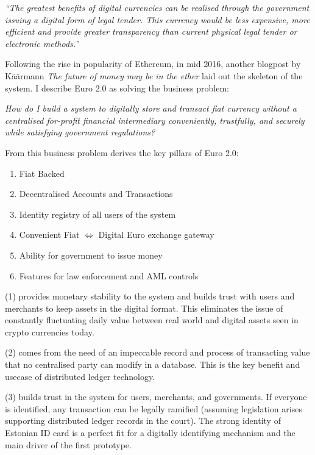 \documentclass[12pt]{article} %
\begin{document}
{{\begin{quoting}
	\textit{``The greatest benefits of digital currencies can be realised through the government issuing a digital form of legal tender. This currency would be less expensive, more efficient and provide greater transparency than current physical legal tender or electronic methods.''}
\end{quoting}

Following the rise in popularity of Ethereum, in mid 2016, another blogpost by Käärmann \textit{The future of money may be in the ether}\cite{kaarmann2016ether} laid out the skeleton of the system. I describe Euro 2.0 as solving the business problem:

\begin{quoting}
	\textit{How do I build a system to digitally store and transact fiat currency without a centralised for-profit financial intermediary conveniently, trustfully, and securely while satisfying government regulations?}
\end{quoting}

From this business problem derives the key pillars of Euro 2.0:

\begin{enumerate}
	\item Fiat Backed
	\item Decentralised Accounts and Transactions
	\item Identity registry of all users of the system
	\item Convenient Fiat $\Longleftrightarrow$ Digital Euro exchange gateway
	\item Ability for government to issue money
	\item Features for law enforcement and AML controls
\end{enumerate}

(1) provides monetary stability to the system and builds trust with users and merchants to keep assets in the digital format. This eliminates the issue of constantly fluctuating daily value between real world and digital assets seen in crypto currencies today.

(2) comes from the need of an impeccable record and process of transacting value that no centralised party can modify in a database. This is the key benefit and usecase of distributed ledger technology.

(3) builds trust in the system for users, merchants, and governments. If everyone is identified, any transaction can be legally ramified (assuming legislation arises supporting distributed ledger records in the court). The strong identity of Estonian ID card is a perfect fit for a digitally identifying mechanism and the main driver of the first prototype.

}}
\end{document}
